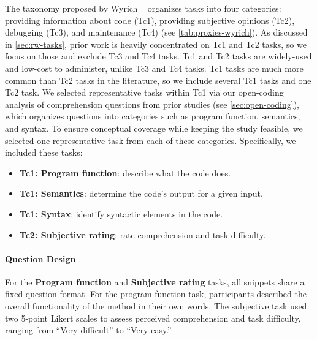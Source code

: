 The taxonomy proposed by Wyrich \etal~\cite{Wyrich:ACS23} organizes tasks into four categories: providing information about code (Tc1), providing subjective opinions (Tc2), debugging (Tc3), and maintenance (Tc4) (see \cref{tab:proxies-wyrich}). As discussed in \cref{sec:rw-tasks}, prior work is heavily concentrated on Tc1 and Tc2 tasks, so we focus on those and exclude Tc3 and Tc4 tasks.
Tc1 and Tc2 tasks are widely-used and low-cost to administer, unlike Tc3 and Tc4 tasks.
Tc1 tasks are much more common than Tc2 tasks in the literature, so we include several Tc1 tasks and one Tc2 task.
We selected representative tasks within Tc1 via our open-coding analysis of comprehension questions from prior studies (see \cref{sec:open-coding}), which organizes questions into categories such as program function, semantics, and syntax. To ensure conceptual coverage while keeping the study feasible, we selected one representative task from each of these categories. 
Specifically, we included these tasks:
\begin{itemize}
    \item \textbf{Tc1: Program function}: describe what the code does. \item \textbf{Tc1: Semantics}: determine the code's output for a given input. \item \textbf{Tc1: Syntax}: identify syntactic elements in the code. \item \textbf{Tc2: Subjective rating}: rate comprehension and task difficulty. \end{itemize}







\paragraph{Question Design}
\label{sec:question-design}
For the \textbf{Program function} and \textbf{Subjective rating} tasks, all snippets share a fixed question format.
For the program function task, participants described the overall functionality of the method in their own words. The subjective task used two 5-point Likert scales to assess perceived comprehension and task difficulty, ranging from ``Very difficult'' to ``Very easy.''

